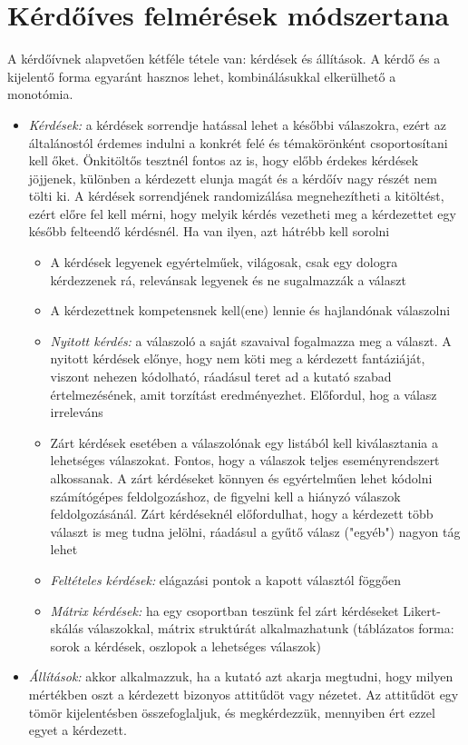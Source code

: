 \chapter{Kérdőíves felmérések módszertana}

A kérdőívnek alapvetően kétféle tétele van: kérdések és állítások. A kérdő és a kijelentő forma egyaránt hasznos lehet, kombinálásukkal elkerülhető a monotómia.
\begin{itemize}
\item \emph{Kérdések:} a kérdések sorrendje hatással lehet a későbbi válaszokra, ezért az általánostól érdemes indulni a konkrét felé és témakörönként csoportosítani kell őket. Önkitöltős tesztnél fontos az is, hogy előbb érdekes kérdések jöjjenek, különben a kérdezett elunja magát és a kérdőív nagy részét nem tölti ki. A kérdések sorrendjének randomizálása megnehezítheti a kitöltést, ezért előre fel kell mérni, hogy melyik kérdés vezetheti meg a kérdezettet egy később felteendő kérdésnél. Ha van ilyen, azt hátrébb kell sorolni
	\begin{itemize}
	\item A kérdések legyenek egyértelműek, világosak, csak egy dologra kérdezzenek rá, relevánsak legyenek és ne sugalmazzák a választ
	\item A kérdezettnek kompetensnek kell(ene) lennie és hajlandónak válaszolni
	\item \emph{Nyitott kérdés:} a válaszoló a saját szavaival fogalmazza meg a választ. A nyitott kérdések előnye, hogy nem köti meg a kérdezett fantáziáját, viszont nehezen kódolható, ráadásul teret ad a kutató szabad értelmezésének, amit torzítást eredményezhet. Előfordul, hog a válasz irreleváns
	\item Zárt kérdések esetében a válaszolónak egy listából kell kiválasztania a lehetséges válaszokat. Fontos, hogy a válaszok teljes eseményrendszert alkossanak. A zárt kérdéseket könnyen és egyértelműen lehet kódolni számítógépes feldolgozáshoz, de figyelni kell a hiányzó válaszok feldolgozásánál. Zárt kérdéseknél előfordulhat, hogy a kérdezett több választ is meg tudna jelölni, ráadásul a gyűtő válasz ("egyéb") nagyon tág lehet
	\item \emph{Feltételes kérdések:} elágazási pontok a kapott választól föggően
	\item \emph{Mátrix kérdések:} ha egy csoportban teszünk fel zárt kérdéseket Likert-skálás válaszokkal, mátrix struktúrát alkalmazhatunk (táblázatos forma: sorok a kérdések, oszlopok a lehetséges válaszok)
	\end{itemize}
\item \emph{Állítások:} akkor alkalmazzuk, ha a kutató azt akarja megtudni, hogy milyen mértékben oszt a kérdezett bizonyos attitűdöt vagy nézetet. Az attitűdöt egy tömör kijelentésben összefoglaljuk, és megkérdezzük, mennyiben ért ezzel egyet a kérdezett.
\end{itemize}

